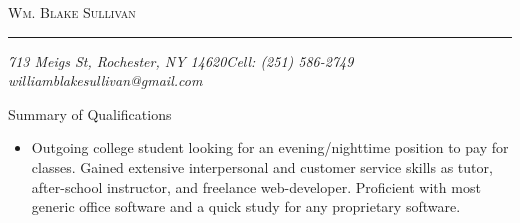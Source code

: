 \documentclass[10pt,oneside]{article}
\makeatletter
\newcommand{\name}{Wm. Blake Sullivan}
\newcommand{\addr}{713 Meigs St, Rochester, NY 14620}
\newcommand{\phone}{Cell: (251) 586-2749}
\newcommand{\email}{williamblakesullivan@gmail.com}
\newcommand{\bigname}[1]{
	\begin{center}\fontfamily{bch}\selectfont\Huge\scshape#1\end{center}
}
\newenvironment{ressection}[1]{
	\vspace{3pt}
	{\fontfamily{bch}\selectfont\Large#1}
	\begin{itemize}
	\vspace{2pt}
}{
	\end{itemize}
}
\newcommand{\ressubitem}[1]{
	\vspace{-1pt}
	\item \begin{flushleft} #1 \end{flushleft}
}
\makeatother
\begin{document}
 \selectfont

\bigname{\name}

\vspace{-4pt} \rule{\textwidth}{1pt}

\vspace{-1pt} {\normalsize\itshape \addr \hfill \phone \\ \email}

\vspace{15 pt}



  \begin{ressection}{Summary of Qualifications}

  	\ressubitem{Outgoing college student looking for an evening/nighttime position to pay for classes. Gained extensive interpersonal and customer service skills as tutor, after-school instructor, and freelance web-developer. Proficient with most generic office software and a quick study for any proprietary software.}

  \end{ressection}
\end{document}

